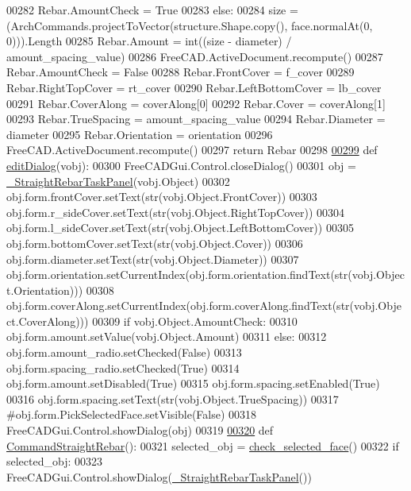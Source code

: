 \begin{DoxyCode}
00282         Rebar.AmountCheck = \textcolor{keyword}{True}
00283     \textcolor{keywordflow}{else}:
00284         size = (ArchCommands.projectToVector(structure.Shape.copy(), face.normalAt(0, 0))).Length
00285         Rebar.Amount = int((size - diameter) / amount\_spacing\_value)
00286         FreeCAD.ActiveDocument.recompute()
00287         Rebar.AmountCheck = \textcolor{keyword}{False}
00288     Rebar.FrontCover = f\_cover
00289     Rebar.RightTopCover = rt\_cover
00290     Rebar.LeftBottomCover = lb\_cover
00291     Rebar.CoverAlong = coverAlong[0]
00292     Rebar.Cover = coverAlong[1]
00293     Rebar.TrueSpacing = amount\_spacing\_value
00294     Rebar.Diameter = diameter
00295     Rebar.Orientation = orientation
00296     FreeCAD.ActiveDocument.recompute()
00297     \textcolor{keywordflow}{return} Rebar
00298 
\hypertarget{StraightRebar_8py_source.tex_l00299}{}\hyperlink{namespaceStraightRebar_ad48f93922ce90bb63d051c7c3c794d35}{00299} \textcolor{keyword}{def }\hyperlink{namespaceStraightRebar_ad48f93922ce90bb63d051c7c3c794d35}{editDialog}(vobj):
00300     FreeCADGui.Control.closeDialog()
00301     obj = \hyperlink{classStraightRebar_1_1__StraightRebarTaskPanel}{\_StraightRebarTaskPanel}(vobj.Object)
00302     obj.form.frontCover.setText(str(vobj.Object.FrontCover))
00303     obj.form.r\_sideCover.setText(str(vobj.Object.RightTopCover))
00304     obj.form.l\_sideCover.setText(str(vobj.Object.LeftBottomCover))
00305     obj.form.bottomCover.setText(str(vobj.Object.Cover))
00306     obj.form.diameter.setText(str(vobj.Object.Diameter))
00307     obj.form.orientation.setCurrentIndex(obj.form.orientation.findText(str(vobj.Object.Orientation)))
00308     obj.form.coverAlong.setCurrentIndex(obj.form.coverAlong.findText(str(vobj.Object.CoverAlong)))
00309     \textcolor{keywordflow}{if} vobj.Object.AmountCheck:
00310         obj.form.amount.setValue(vobj.Object.Amount)
00311     \textcolor{keywordflow}{else}:
00312         obj.form.amount\_radio.setChecked(\textcolor{keyword}{False})
00313         obj.form.spacing\_radio.setChecked(\textcolor{keyword}{True})
00314         obj.form.amount.setDisabled(\textcolor{keyword}{True})
00315         obj.form.spacing.setEnabled(\textcolor{keyword}{True})
00316         obj.form.spacing.setText(str(vobj.Object.TrueSpacing))
00317     \textcolor{comment}{#obj.form.PickSelectedFace.setVisible(False)}
00318     FreeCADGui.Control.showDialog(obj)
00319 
\hypertarget{StraightRebar_8py_source.tex_l00320}{}\hyperlink{namespaceStraightRebar_a30f7aada2e2f91cdfae8267da36fe277}{00320} \textcolor{keyword}{def }\hyperlink{namespaceStraightRebar_a30f7aada2e2f91cdfae8267da36fe277}{CommandStraightRebar}():
00321     selected\_obj = \hyperlink{namespaceRebarfunc_adae2713855a7e1b4bda04081ae671542}{check\_selected\_face}()
00322     \textcolor{keywordflow}{if} selected\_obj:
00323         FreeCADGui.Control.showDialog(\hyperlink{classStraightRebar_1_1__StraightRebarTaskPanel}{\_StraightRebarTaskPanel}())
\end{DoxyCode}
